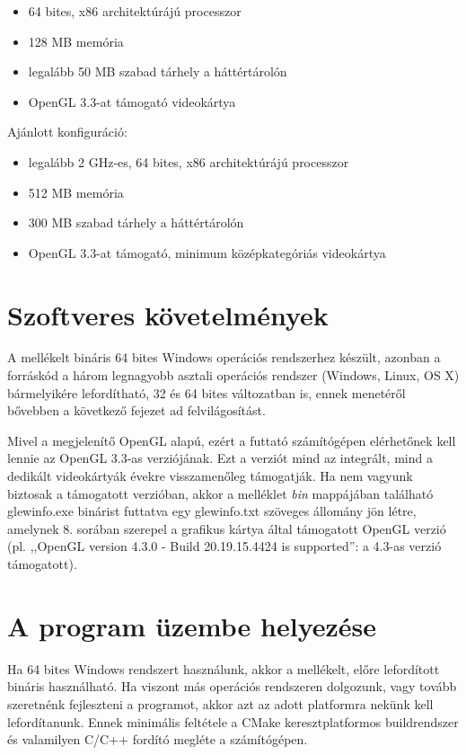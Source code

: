 \begin{itemize}
  \item 64 bites, x86 architektúrájú processzor
  \item 128 MB memória
  \item legalább 50 MB szabad tárhely a háttértárolón
  \item OpenGL 3.3-at támogató videokártya
\end{itemize}

\noindent
Ajánlott konfiguráció:

\begin{itemize}
  \item legalább 2 GHz-es, 64 bites, x86 architektúrájú processzor
  \item 512 MB memória
  \item 300 MB szabad tárhely a háttértárolón
  \item OpenGL 3.3-at támogató, minimum középkategóriás videokártya
\end{itemize}

\section{Szoftveres követelmények}

A mellékelt bináris 64 bites Windows operációs rendszerhez készült, azonban a forráskód a három legnagyobb asztali operációs rendszer (Windows, Linux, OS X) bármelyikére lefordítható, 32 és 64 bites változatban is, ennek menetéről bővebben a következő fejezet ad felvilágosítást.

Mivel a megjelenítő OpenGL alapú, ezért a futtató számítógépen elérhetőnek kell lennie az OpenGL 3.3-as verziójának. Ezt a verziót mind az integrált, mind a dedikált videokártyák évekre visszamenőleg támogatják. Ha nem vagyunk biztosak a támogatott verzióban, akkor a melléklet \textit{bin} mappájában található glewinfo.exe binárist futtatva egy glewinfo.txt szöveges állomány jön létre, amelynek 8. sorában szerepel a grafikus kártya által támogatott OpenGL verzió (pl. ,,OpenGL version 4.3.0 - Build 20.19.15.4424 is supported'': a 4.3-as verzió támogatott).

\section{A program üzembe helyezése}

Ha 64 bites Windows rendszert használunk, akkor a mellékelt, előre lefordított bináris használható. Ha viszont más operációs rendszeren dolgozunk, vagy tovább szeretnénk fejleszteni a programot, akkor azt az adott platformra nekünk kell lefordítanunk. Ennek minimális feltétele a CMake keresztplatformos buildrendszer és valamilyen C/C++ fordító megléte a számítógépen.


